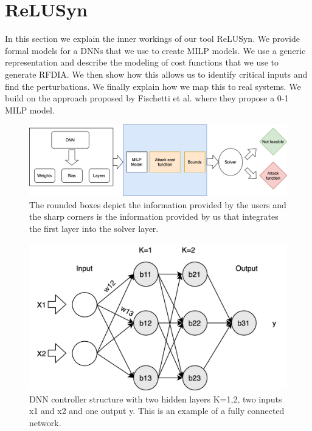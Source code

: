\chapter{ReLUSyn}
\label{relusyn}
In this section we explain the inner workings of our tool ReLUSyn. 
We provide formal models for a \ac{DNN}s that we use to create \ac{MILP} models. 
We use a generic representation and describe the modeling of cost functions that we use to generate \ac{RFDIA}.
We then show how this allows us to identify critical inputs and find the perturbations. 
We finally explain how we map this to real systems. 
We build on the approach proposed by Fischetti et al. \cite{fischetti2017deep} where they propose a 0-1 MILP model. 
\begin{figure}
	\centering
	\includegraphics[scale=0.1]{Images/Methodology}
	\caption[Methodology]{The rounded boxes depict the information provided by the users and the sharp corners is the information provided by us that integrates the first layer into the solver layer.}
	\label{fig:methodology}
\end{figure}

\begin{figure}
	\centering
	\includegraphics[width=0.7\linewidth]{Images/DNNstructure}
	\caption[DNN structure]{DNN controller structure with two hidden layers K=1,2, two inputs x1 and x2 and one output y. This is an example of a fully connected network.}
	\label{fig:dnn-controller}
\end{figure}


